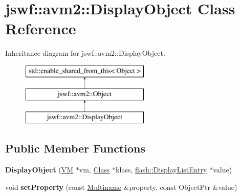 \hypertarget{classjswf_1_1avm2_1_1_display_object}{\section{jswf\+:\+:avm2\+:\+:Display\+Object Class Reference}
\label{classjswf_1_1avm2_1_1_display_object}
}
Inheritance diagram for jswf\+:\+:avm2\+:\+:Display\+Object\+:\begin{figure}[H]
\begin{center}
\leavevmode
\includegraphics[height=3.000000cm]{classjswf_1_1avm2_1_1_display_object}
\end{center}
\end{figure}
\subsection*{Public Member Functions}
\begin{DoxyCompactItemize}
\item 
\hypertarget{classjswf_1_1avm2_1_1_display_object_a21dbe0d8901758a89fe6281733d78d3f}{{\bfseries Display\+Object} (\hyperlink{classjswf_1_1avm2_1_1_v_m}{V\+M} $\ast$vm, \hyperlink{classjswf_1_1avm2_1_1_class}{Class} $\ast$klass, \hyperlink{structjswf_1_1flash_1_1_display_list_entry}{flash\+::\+Display\+List\+Entry} $\ast$value)}\label{classjswf_1_1avm2_1_1_display_object_a21dbe0d8901758a89fe6281733d78d3f}

\item 
\hypertarget{classjswf_1_1avm2_1_1_display_object_afe14733203066e32329bb2441c1327b3}{void {\bfseries set\+Property} (const \hyperlink{structjswf_1_1avm2_1_1_multiname}{Multiname} \&property, const Object\+Ptr \&value)}\label{classjswf_1_1avm2_1_1_display_object_afe14733203066e32329bb2441c1327b3}

\end{DoxyCompactItemize}
